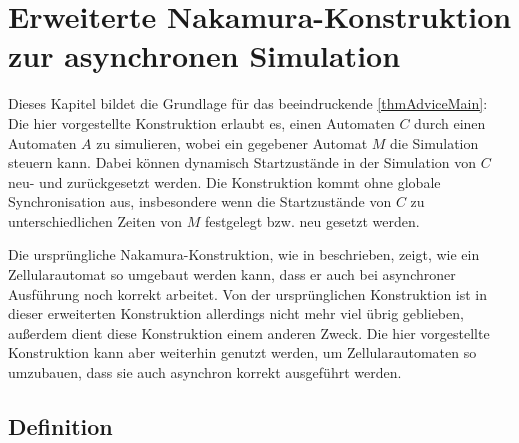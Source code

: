 \chapter{Erweiterte Nakamura-Konstruktion zur asynchronen Simulation}
\label{chap:ErweiterteNakamuraKonstr}

Dieses Kapitel bildet die Grundlage für das beeindruckende \cref{thmAdviceMain}:
Die hier vorgestellte Konstruktion erlaubt es, einen Automaten $C$ durch einen Automaten $A$
zu simulieren,
wobei ein gegebener Automat $M$ die Simulation steuern kann.
Dabei können dynamisch Startzustände in der Simulation von $C$ neu- und zurückgesetzt werden.
Die Konstruktion kommt ohne globale Synchronisation aus,
insbesondere wenn die Startzustände von $C$ zu unterschiedlichen Zeiten von $M$ festgelegt \acs{bzw.} neu gesetzt werden.

Die ursprüngliche Nakamura-Konstruktion, wie in \cite{worsch2010note} beschrieben,
zeigt, wie ein Zellularautomat so umgebaut werden kann, dass er auch bei asynchroner 
Ausführung noch korrekt arbeitet.
Von der ursprünglichen Konstruktion ist in dieser erweiterten Konstruktion
allerdings nicht mehr viel übrig geblieben, außerdem dient diese Konstruktion einem anderen Zweck.
Die hier vorgestellte Konstruktion kann aber weiterhin genutzt werden,
um Zellularautomaten so umzubauen, dass sie auch asynchron korrekt ausgeführt werden.

\section{Definition}


